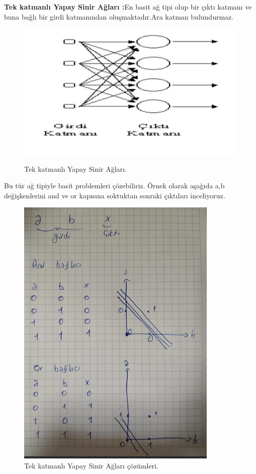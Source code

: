 \documentclass[12pt, a4paper]{article}
\begin{document}
	\textbf{Tek katmanlı Yapay Sinir Ağları :}En basit ağ tipi olup bir çıktı katmanı ve buna bağlı bir girdi katmanından oluşmaktadır.Ara katman bulundurmaz.
	\begin{figure}[!h]
		\centering
		\includegraphics{4.8.png}
		\caption{Tek katmanlı Yapay Sinir Ağları.}
		\cite{SlideServe}
	\end{figure}
	\newline Bu tür ağ tipiyle basit problemleri çözebiliriz.
	Örnek olarak aşağıda a,b değişkenlerini and ve or kapısına soktuktan sonraki çıktıları inceliyoruz.
	\begin{figure}[!h]
		\centering
		\includegraphics{4.9.png}
		\caption{Tek katmanlı Yapay Sinir Ağları çözümleri.}
	\end{figure}
\end{document}
